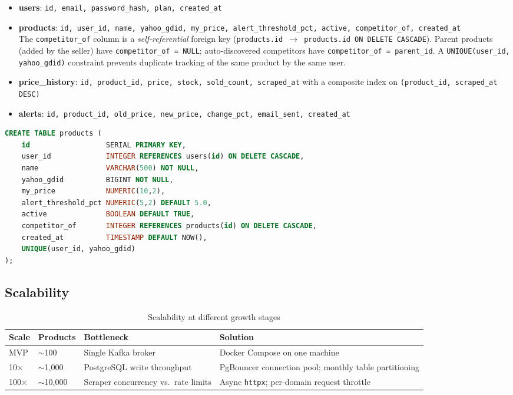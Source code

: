 \documentclass[11pt,a4paper]{article}
\begin{document}
\begin{itemize}
  \item \textbf{users}: \texttt{id, email, password\_hash, plan, created\_at}
  \item \textbf{products}: \texttt{id, user\_id, name, yahoo\_gdid, my\_price,
        alert\_threshold\_pct, active, competitor\_of, created\_at}\\
        The \texttt{competitor\_of} column is a \emph{self-referential} foreign
        key (\texttt{products.id $\to$ products.id ON DELETE CASCADE}).
        Parent products (added by the seller) have \texttt{competitor\_of = NULL};
        auto-discovered competitors have \texttt{competitor\_of = parent\_id}.
        A \texttt{UNIQUE(user\_id, yahoo\_gdid)} constraint prevents duplicate
        tracking of the same product by the same user.
  \item \textbf{price\_history}: \texttt{id, product\_id, price, stock,
        sold\_count, scraped\_at} with a composite index on
        \texttt{(product\_id, scraped\_at DESC)}
  \item \textbf{alerts}: \texttt{id, product\_id, old\_price, new\_price,
        change\_pct, email\_sent, created\_at}
\end{itemize}

\begin{lstlisting}[language=SQL, caption={Key products table definition}]
CREATE TABLE products (
    id                  SERIAL PRIMARY KEY,
    user_id             INTEGER REFERENCES users(id) ON DELETE CASCADE,
    name                VARCHAR(500) NOT NULL,
    yahoo_gdid          BIGINT NOT NULL,
    my_price            NUMERIC(10,2),
    alert_threshold_pct NUMERIC(5,2) DEFAULT 5.0,
    active              BOOLEAN DEFAULT TRUE,
    competitor_of       INTEGER REFERENCES products(id) ON DELETE CASCADE,
    created_at          TIMESTAMP DEFAULT NOW(),
    UNIQUE(user_id, yahoo_gdid)
);
\end{lstlisting}

\subsection{Scalability}

\begin{table}[H]
\centering\small\renewcommand{\arraystretch}{1.2}
\begin{tabularx}{\textwidth}{C{1.6cm} C{2.2cm} L{3.2cm} X}
\toprule
\textbf{Scale} & \textbf{Products} & \textbf{Bottleneck} & \textbf{Solution} \\
\midrule
MVP    & $\sim$100   & Single Kafka broker   & Docker Compose on one machine \\
10$\times$  & $\sim$1,000  & PostgreSQL write throughput & PgBouncer connection pool; monthly table partitioning \\
100$\times$ & $\sim$10,000 & Scraper concurrency vs.\ rate limits & Async \texttt{httpx}; per-domain request throttle \\
\bottomrule
\end{tabularx}
\caption{Scalability at different growth stages}
\end{table}
\end{document}
